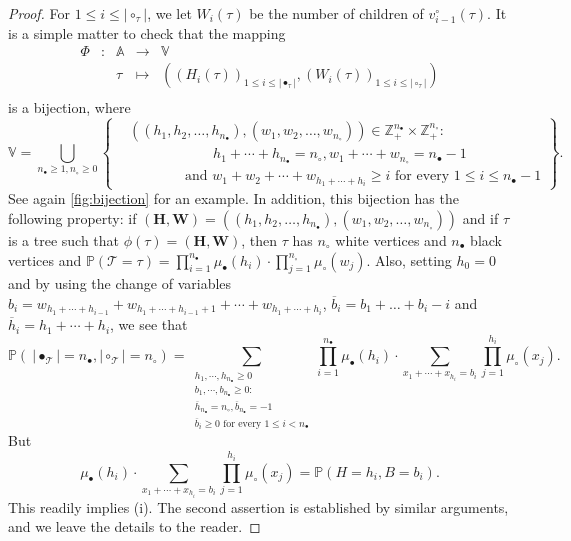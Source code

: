 \documentclass[10pt]{amsart}
\theoremstyle{definition}\newtheorem{defi}[theo]{Definition}\newtheorem{rema}[theo]{Remark}\newtheorem{exam}[theo]{Example}\newtheorem{exem}[theo]{Example}\newtheorem{nota}[theo]{Notation}
\providecommand{\abs}[1]{\lvert#1\rvert}
\newcommand{\Z}{\mathbb{Z}}
\def\nc{n_{\circ}}
\def\nb{n_{\bullet}}
\def\Ts{\mathscr{T}}
\renewcommand\Pr[1]{\mathbb{P}\left(#1\right)}
\begin{document}
\begin{proof}
For $1 \leq i \leq \abs{\circ_{\tau}}$, we let $W_{i}(\tau)$ be the number of children of $v^{\circ}_{i-1}(\tau)$.
It is a simple matter to check that the mapping
\[\begin{array}{ccccc}
\Phi& : & \mathbb{A} & \longrightarrow & \mathbb{V} \\
 & & \tau & \longmapsto &  \left(  (H_{i}(\tau))_{1 \leq i \leq \abs{\bullet_{\tau}}} ,   (W_{i}(\tau))_{1 \leq i \leq \abs{\circ_{\tau}}} \right) \\
\end{array}\]
is a bijection, where
\begin{equation*}
\! \!\mathbb{V}= \bigcup_{\nb \geq 1, \nc \geq 0} \left\{ \begin{split} &
  \left(  (h_{1},h_{2}, \ldots,h_{\nb}), (w_{1}, w_{2}, \ldots, w_{\nc}) \right) \in \Z_{+}^{\nb} \times \Z_{+}^{\nc} :  \\
  &  \qquad\qquad\qquad h_{1}+ \cdots+h_{\nb}=\nc, w_{1}+ \cdots+w_{\nc}=\nb-1 \\
     & \qquad\qquad \textrm{and } w_{1}+ w_{2}+ \cdots+w_{h_{1}+ \cdots+h_{i}} \geq i \textrm{ for every } 1 \leq i \leq \nb-1 \end{split}\right\}.
\end{equation*}
See again \cref{fig:bijection} for an example.
In addition, this bijection has the following property: if $(\bm{H},\bm{W})= \left(  (h_{1},h_{2}, \ldots,h_{\nb}), (w_{1}, w_{2}, \ldots, w_{\nc}) \right)$ and if $\tau$ is a tree such that $\phi(\tau)=(\bm{H},\bm{W})$, then $\tau$ has $\nc$ white vertices and $\nb$ black vertices and $\Pr{ \Ts=\tau}= \prod_{i=1} ^{\nb} \mu_{\bullet}(h_{i}) \cdot \prod_{j=1}^{\nc}\mu_{\circ}(w_{j})$.
Also, setting $h_{0}=0$ and by using the change of variables $b_{i}=w_{h_{1}+ \cdots+h_{i-1}}+ w_{h_{1}+ \cdots+h_{i-1}+1}+ \cdots+w_{h_{1}+ \cdots+h_{i}}$, $\overline{b}_{i}= b_1+\dots+b_i-i$ and $\overline{h}_{i}=h_{1}+ \cdots+h_{i}$, we see that
\[
\Pr{\ \abs{\bullet_{\Ts}} =\nb,\abs{\circ_{\Ts}}=\nc}= \sum_{\substack{ h_{1}, \cdots, h_{\nb} \geq 0\\ b_{1}, \cdots, b_{\nb} \geq 0 :  \\ \overline{h}_{\nb}=\nc, \overline{b}_{\nb}=-1 \\ \overline{b}_{i} \geq 0 \textrm{ for every } 1 \leq i  < \nb}}  \prod_{i=1} ^{\nb} \mu_{\bullet}(h_{i}) \cdot \sum_{x_{1}+\cdots+x_{h_{i}}= b_{i}} \prod_{j=1}^{h_{i}}\mu_{\circ}(x_{j}).
\]
But \[ \mu_{\bullet}(h_{i}) \cdot \sum_{x_{1}+\cdots+x_{h_{i}}= b_{i}} \prod_{j=1}^{h_{i}}\mu_{\circ}(x_{j})= \Pr{H=h_{i},B=b_{i}}.\]
This readily implies (i). The second assertion is established by similar arguments, and we leave the details to the reader.
\end{proof}
\end{document}
